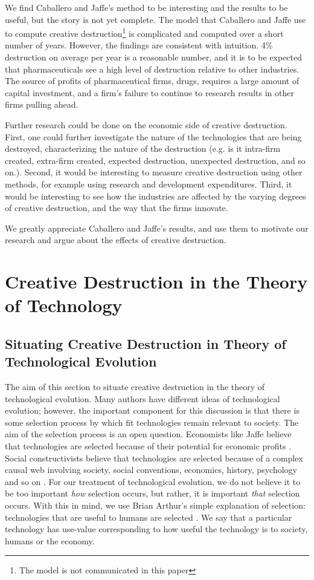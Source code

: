 \documentclass[11pt]{article}
\begin{document}
We find Caballero and Jaffe's method to be interesting and the results to be useful, but the story is not yet complete.
The model that Caballero and Jaffe use to compute creative destruction\footnote{The model is not communicated in this paper} is complicated and computed over a short number of years.
However, the findings are consistent with intuition.
4\% destruction on average per year is a reasonable number, and it is to be expected that pharmaceuticals see a high level of destruction relative to other industries. 
The source of profits of pharmaceutical firms, drugs, requires a large amount of capital investment, and a firm's failure to continue to research results in other firms pulling ahead.

Further research could be done on the economic side of creative destruction.
First, one could further investigate the nature of the technologies that are being destroyed, characterizing the nature of the destruction (e.g. is it intra-firm created, extra-firm created, expected destruction, unexpected destruction, and so on.).
Second, it would be interesting to measure creative destruction using other methods, for example using research and development expenditures.
Third, it would be interesting to see how the industries are affected by the varying degrees of creative destruction, and the way that the firms innovate.

We greatly appreciate Caballero and Jaffe's results, and use them to motivate our research and argue about the effects of creative destruction.

\section{Creative Destruction in the Theory of Technology}
\subsection{Situating Creative Destruction in Theory of Technological Evolution}
The aim of this section to situate creative destruction in the theory of technological evolution.
Many authors have different ideas of technological evolution; however, the important component for this discussion is that there is some selection process by which fit technologies remain relevant to society.
The aim of the selection process is an open question.
Economists like Jaffe believe that technologies are selected because of their potential for economic profits \cite{jaffe}.
Social constructivists believe that technologies are selected because of a complex causal web involving society, social conventions, economics, history, psychology and so on \cite{scot}.
For our treatment of technological evolution, we do not believe it to be too important \textit{how} selection occurs, but rather, it is important \textit{that} selection occurs. 
With this in mind, we use Brian Arthur's simple explanation of selection: technologies that are useful to humans are selected \cite{arthur}.
We say that a particular technology has use-value corresponding to how useful the technology is to society, humans or the economy. 
\end{document}

